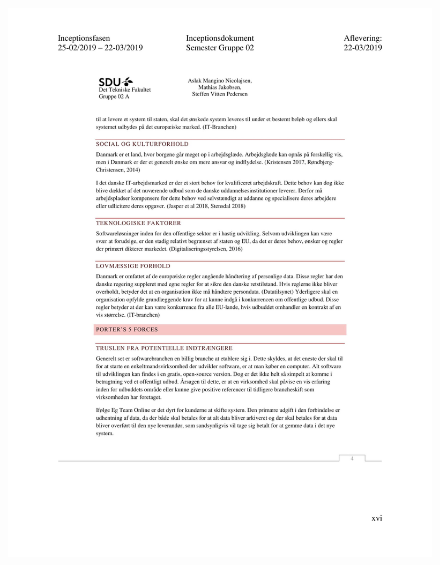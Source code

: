 \begin{figure}[hb]
  \includegraphics[scale = 0.33]{./PNG/Inceptions/Gruppe 02 + InceptionsDokument-49.jpg} 
\end{figure}

